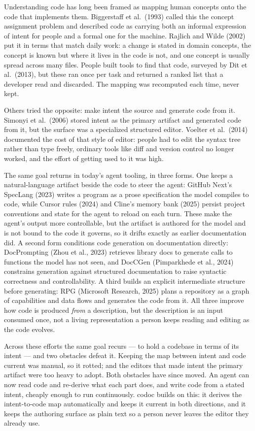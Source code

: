 \documentclass[sigconf,nonacm]{acmart}
\begin{document}
Understanding code has long been framed as mapping human concepts onto the code
that implements them. Biggerstaff et al.\ (1993) called this the concept
assignment problem and described code as carrying both an informal expression of
intent for people and a formal one for the machine. Rajlich and Wilde (2002) put
it in terms that match daily work: a change is stated in domain concepts, the
concept is known but where it lives in the code is not, and one concept is usually
spread across many files. People built tools to find that code, surveyed by Dit et
al.\ (2013), but these ran once per task and returned a ranked list that a
developer read and discarded. The mapping was recomputed each time, never kept.

Others tried the opposite: make intent the source and generate code from it.
Simonyi et al.\ (2006) stored intent as the primary artifact and generated code
from it, but the surface was a specialized structured editor. Voelter et al.\
(2014) documented the cost of that style of editor: people had to edit the syntax
tree rather than type freely, ordinary tools like diff and version control no
longer worked, and the effort of getting used to it was high.

The same goal returns in today's agent tooling, in three forms. One keeps a
natural-language artifact beside the code to steer the agent: GitHub Next's
SpecLang (2023) writes a program as a prose specification the model compiles to
code, while Cursor rules (2024) and Cline's memory bank (2025) persist project
conventions and state for the agent to reload on each turn. These make the
agent's output more controllable, but the artifact is authored for the model and
is not bound to the code it governs, so it drifts exactly as earlier
documentation did. A second form conditions code generation on documentation
directly: DocPrompting (Zhou et al., 2023) retrieves library docs to generate
calls to functions the model has not seen, and DocCGen (Pimparkhede et al., 2024)
constrains generation against structured documentation to raise syntactic
correctness and controllability. A third builds an explicit intermediate
structure before generating: RPG (Microsoft Research, 2025) plans a repository as
a graph of capabilities and data flows and generates the code from it. All three
improve how code is produced \emph{from} a description, but the description is an
input consumed once, not a living representation a person keeps reading and
editing as the code evolves.

Across these efforts the same goal recurs --- to hold a codebase in terms of its
intent --- and two obstacles defeat it. Keeping the map between intent and code
current was manual, so it rotted; and the editors that made intent the primary
artifact were too heavy to adopt. Both obstacles have since moved. An agent can
now read code and re-derive what each part does, and write code from a stated
intent, cheaply enough to run continuously. codoc builds on this: it derives the
intent-to-code map automatically and keeps it current in both directions, and it
keeps the authoring surface as plain text so a person never leaves the editor
they already use.
\end{document}
